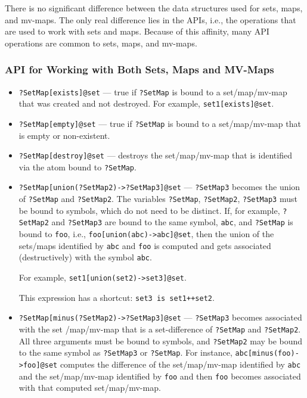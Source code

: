 There is no significant difference between the data structures used for
sets, maps,
and mv-maps. The only real difference lies in the APIs, i.e., the
operations that are used to work with sets and maps. Because of this affinity,
many API operations are common to
sets, maps, and mv-maps.

\subsubsection{API for Working with Both  Sets, Maps and MV-Maps}
\label{sec-api-set-map}

\begin{itemize}
\item  \texttt{?SetMap[exists]@\bs{}set} --- true if \texttt{?SetMap} is bound to
  a set/map/mv-map that was created and not destroyed.
  For example, \texttt{set1[exists]@\bs{}set}. 
\item \texttt{?SetMap[empty]@\bs{}set} --- true if \texttt{?SetMap} is bound to
  a set/map/mv-map that is empty or non-existent.
\item \texttt{?SetMap[destroy]@\bs{}set} --- destroys the set/map/mv-map that is
  identified via the atom bound to \texttt{?SetMap}.
\item \texttt{?SetMap[union(?SetMap2)->?SetMap3]@\bs{}set} --- \texttt{?SetMap3}
  becomes the union of \texttt{?SetMap} and \texttt{?SetMap2}. The variables
  \texttt{?SetMap}, \texttt{?SetMap2}, \texttt{?SetMap3} must be bound to symbols,
  which do not need to be distinct.
  If, for example, \texttt{?SetMap2} and \texttt{?SetMap3} are bound to the same
  symbol, \texttt{abc}, and \texttt{?SetMap} is bound to \texttt{foo},
  i.e., \texttt{foo[union(abc)->abc]@\bs{}set}, then the
  union of the sets/maps identified by \texttt{abc} and \texttt{foo} is
  computed and gets associated (destructively) with the symbol
  \texttt{abc}.

  For example, \texttt{set1[union(set2)->set3]@\bs{}set}. 

  This expression has a shortcut:  \texttt{set3 \bs{}is set1++set2}.   

\item \texttt{?SetMap[minus(?SetMap2)->?SetMap3]@\bs{}set} --- \texttt{?SetMap3}
  becomes associated with the set /map/mv-map that is a set-difference of \texttt{?SetMap}
  and \texttt{?SetMap2}. All three arguments must be bound to symbols, and
  \texttt{?SetMap2} may be bound to the same symbol as \texttt{?SetMap3} or
  \texttt{?SetMap}. For instance, \texttt{abc[minus(foo)->foo]@\bs{}set}      
  computes the difference of the set/map/mv-map identified by \texttt{abc} and the
  set/map/mv-map identified by \texttt{foo} and then \texttt{foo} becomes associated
  with that computed set/map/mv-map.


\end{itemize}
